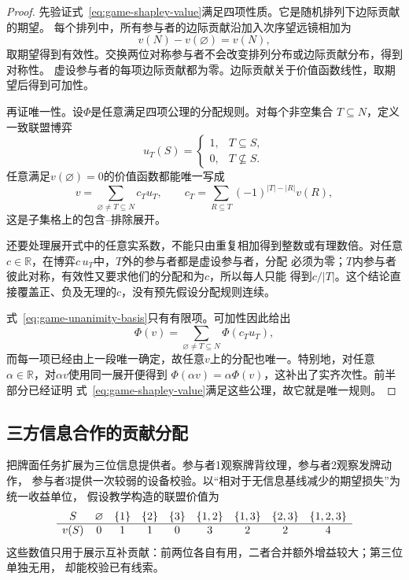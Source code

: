 \begin{proof}
先验证式~\eqref{eq:game-shapley-value}满足四项性质。它是随机排列下边际贡献的期望。
每个排列中，所有参与者的边际贡献沿加入次序望远镜相加为
\[
  v(N)-v(\varnothing)=v(N),
\]
取期望得到有效性。交换两位对称参与者不会改变排列分布或边际贡献分布，得到对称性。
虚设参与者的每项边际贡献都为零。边际贡献关于价值函数线性，取期望后得到可加性。

再证唯一性。设\(\Phi\)是任意满足四项公理的分配规则。对每个非空集合
\(T\subseteq N\)，定义一致联盟博弈
\[
  u_T(S)
  =
  \begin{cases}
    1,&T\subseteq S,\\
    0,&T\nsubseteq S.
  \end{cases}
\]
任意满足\(v(\varnothing)=0\)的价值函数都能唯一写成
\begin{equation}
  v
  =
  \sum_{\varnothing\neq T\subseteq N}
  c_Tu_T,
  \qquad
  c_T
  =
  \sum_{R\subseteq T}
  (-1)^{|T|-|R|}v(R),
  \label{eq:game-unanimity-basis}
\end{equation}
这是子集格上的包含--排除展开。

还要处理展开式中的任意实系数，不能只由重复相加得到整数或有理数倍。对任意
\(c\in\mathbb{R}\)，在博弈\(c\,u_T\)中，\(T\)外的参与者都是虚设参与者，分配
必须为零；\(T\)内参与者彼此对称，有效性又要求他们的分配和为\(c\)，所以每人只能
得到\(c/|T|\)。这个结论直接覆盖正、负及无理的\(c\)，没有预先假设分配规则连续。

式~\eqref{eq:game-unanimity-basis}只有有限项。可加性因此给出
\[
  \Phi(v)
  =
  \sum_{\varnothing\neq T\subseteq N}
  \Phi(c_Tu_T),
\]
而每一项已经由上一段唯一确定，故任意\(v\)上的分配也唯一。特别地，对任意
\(\alpha\in\mathbb{R}\)，对\(\alpha v\)使用同一展开便得到
\(\Phi(\alpha v)=\alpha\Phi(v)\)，这补出了实齐次性。前半部分已经证明
式~\eqref{eq:game-shapley-value}满足这些公理，故它就是唯一规则。
\end{proof}

\subsection{三方信息合作的贡献分配}

把牌面任务扩展为三位信息提供者。参与者1观察牌背纹理，参与者2观察发牌动作，
参与者3提供一次较弱的设备校验。以“相对于无信息基线减少的期望损失”为统一收益单位，
假设教学构造的联盟价值为
\[
\begin{array}{c@{\quad}cccccccc}
  S
  &\varnothing&\{1\}&\{2\}&\{3\}
  &\{1,2\}&\{1,3\}&\{2,3\}&\{1,2,3\}\\ \hline
  v(S)
  &0&1&1&0&3&2&2&4
\end{array}
\]
这些数值只用于展示互补贡献：前两位各自有用，二者合并额外增益较大；第三位单独无用，
却能校验已有线索。

